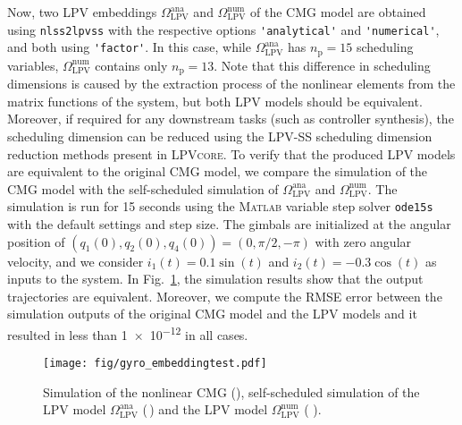    Now, two LPV embeddings $\Omega_\mathrm{LPV}^\mathrm{ana}$ and $\Omega_\mathrm{LPV}^\mathrm{num}$ of the CMG model are obtained using \lstinline{nlss2lpvss} with the respective options \lstinline{'analytical'} and \lstinline{'numerical'}, and both using \lstinline{'factor'}. In this case, while $\Omega_\mathrm{LPV}^\mathrm{ana}$ has $n_\mathrm{p} = 15$ scheduling variables, $\Omega_\mathrm{LPV}^\mathrm{num}$ contains only $n_\mathrm{p} = 13$. Note that this difference in scheduling dimensions is caused by the extraction process of the nonlinear elements from the matrix functions of the system, but both LPV models should be equivalent. Moreover, if required for any downstream tasks (such as controller synthesis), the scheduling dimension can be reduced using the LPV-SS scheduling dimension reduction methods present in \textsc{LPVcore}. To verify that the produced LPV models are equivalent to the original CMG model, we compare the simulation of the CMG model with the self-scheduled simulation of $\Omega_\mathrm{LPV}^\mathrm{ana}$ and $\Omega_\mathrm{LPV}^\mathrm{num}$. The simulation is run for 15 seconds using the \textsc{Matlab} variable step solver \mbox{\lstinline{ode15s}} with the default settings and step size. The gimbals are initialized at the angular position of $(q_1(0), q_2(0), q_4(0)) = (0, \pi/2, -\pi)$ with zero angular velocity, and we consider $i_1(t) = 0.1 \sin(t)$ and $i_2(t) = -0.3 \cos(t)$ as inputs to the system. In Fig.~\ref{fig:sim_gyro_LPVembedding}, the simulation results show that the output trajectories are equivalent. Moreover, we compute the RMSE error between the simulation outputs of the original CMG model and the LPV models and it resulted in less than \num{1e-12} in all cases.
\begin{figure}[t]
    \centering
    \texttt{[image: fig/gyro\_embeddingtest.pdf]}
    \caption{Simulation of the nonlinear CMG (), self-scheduled simulation of the LPV model $\Omega_\mathrm{LPV}^\mathrm{ana}$ (\,) and the LPV model $\Omega_\mathrm{LPV}^\mathrm{num}$ (\,\,).}
    \label{fig:sim_gyro_LPVembedding}
\end{figure}





